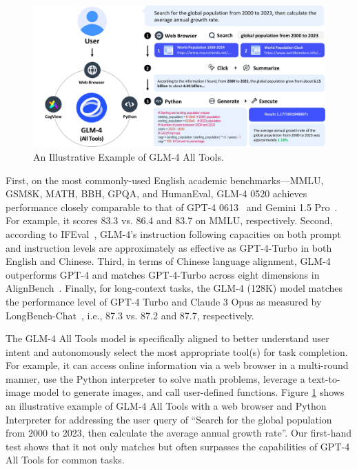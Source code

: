 \begin{figure}[tb]
    \centering
    \includegraphics[width=\linewidth]{figs/alltools-example-2.pdf}
    \caption{An Illustrative Example of GLM-4 All Tools.
    }
    \label{fig:alltools-example}
\end{figure}

First, on the most commonly-used English academic benchmarks---MMLU, GSM8K, MATH, BBH, GPQA, and HumanEval, GLM-4 0520 achieves performance closely comparable to that of GPT-4 0613~\cite{openai2023gpt} and Gemini 1.5 Pro~\cite{geminiteam2023gemini}. 
For example, it scores 83.3 vs. 86.4 and 83.7 on MMLU, respectively. 
Second, according to IFEval~\cite{zhou2023instruction}, GLM-4's instruction following capacities on both prompt and instruction levels are approximately as effective as GPT-4-Turbo in both English and Chinese. 
Third, in terms of  Chinese language alignment, GLM-4 outperforms GPT-4 and matches GPT-4-Turbo across eight dimensions in AlignBench~\cite{liu2023alignbench}.   
Finally, for long-context tasks, the GLM-4 (128K) model matches the performance level of GPT-4 Turbo and Claude 3 Opus as measured by LongBench-Chat~\cite{bai2024longalign}, i.e., 87.3 vs. 87.2 and 87.7, respectively. 




The GLM-4 All Tools model is specifically aligned to better understand user intent and autonomously select the most appropriate tool(s) for task completion. 
For example, it can access online information via a web browser in a multi-round manner, use the Python interpreter to solve math problems, leverage a text-to-image model to generate images, and  call user-defined functions. 
Figure \ref{fig:alltools-example} shows an illustrative example of GLM-4 All Tools with a web browser and Python Interpreter for addressing the user query of ``Search for the global population from 2000 to 2023, then calculate the average annual growth rate''.  
Our first-hand test shows that it not only matches but often surpasses the capabilities of GPT-4 All Tools for common tasks. 





